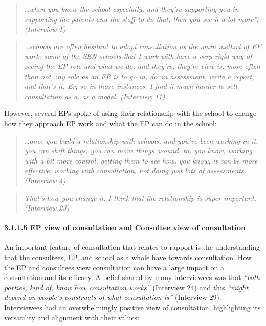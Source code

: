 \documentclass[
  english,
  man]{apa}
\let\oldparagraph\paragraph
\renewcommand{\paragraph}[1]{\oldparagraph{#1}\mbox{}}
\begin{document}
\begin{quote}
\emph{\ldots when you know the school especially, and they're supporting you in
supporting the parents and the staff to do that, then you see it a lot
more". (Interview 1)}
\end{quote}

\begin{quote}
\emph{\ldots schools are often hesitant to adopt consultation as the main method
of EP work: some of the SEN schools that I work with have a very rigid
way of seeing the EP role and what we do, and they're, they're view
is, more often than not, my role as an EP is to go in, do an
assessment, write a report, and that's it. Er, so in those instances,
I find it much harder to sell consultation as a, as a model.
(Interview 11)}
\end{quote}

However, several EPs spoke of using their relationship with the school to change how they approach EP work and what the EP can do in the school:

\begin{quote}
\emph{\ldots once you build a relationship with schools, and you've been working
in it, you can shift things, you can move things around, to, you know,
working with a bit more control, getting them to see how, you know, it
can be more effective, working with consultation, not doing just lots
of assessments. (Interview 4)}
\end{quote}

\begin{quote}
\emph{That's how you change it. I think that the relationship is super
important. (Interview 23)}
\end{quote}

\hypertarget{ep-view-of-consultation-and-consultee-view-of-consultation}{%
\paragraph{3.1.1.5 EP view of consultation and Consultee view of consultation}\label{ep-view-of-consultation-and-consultee-view-of-consultation}}

An important feature of consultation that relates to rapport is the understanding that the consultees, EP, and school as a whole have towards consultation. How the EP and consultees view consultation can have a large impact on a consultation and its efficacy. A belief shared by many interviewees was that \emph{``both parties, kind of, know how consultation works''} (Interview 24) and this \emph{``might depend on people's constructs of what consultation is''} (Interview 29). Interviewees had an overwhelmingly positive view of consultation, highlighting its versatility and alignment with their values:
\end{document}
